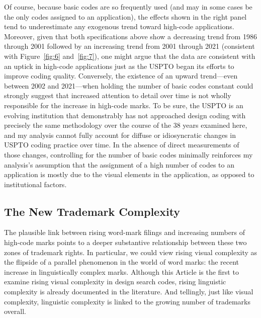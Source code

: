 \documentclass[letterpaper, 11pt, oneside]{article}
\begin{document}
Of course, because basic codes are so frequently used (and may in some cases be the only codes assigned to an application), the effects shown in the right panel tend to underestimate any exogenous trend toward high-code applications. Moreover, given that both specifications above show a decreasing trend from 1986 through 2001 followed by an increasing trend from 2001 through 2021 (consistent with Figure~\ref{fig:6} and~\ref{fig:7}), one might argue that the data are consistent with an uptick in high-code applications just as the USPTO began its efforts to improve coding quality. Conversely, the existence of an upward trend—even between 2002 and 2021—when holding the number of basic codes constant could strongly suggest that increased attention to detail over time is not wholly responsible for the increase in high-code marks. To be sure, the USPTO is an evolving institution that demonstrably has not approached design coding with precisely the same methodology over the course of the 38 years examined here, and my analysis cannot fully account for diffuse or idiosyncratic changes in USPTO coding practice over time. In the absence of direct measurements of those changes, controlling for the number of basic codes minimally reinforces my analysis's assumption that the assignment of a high number of codes to an application is mostly due to the visual elements in the application, as opposed to institutional factors.

\subsection{The New Trademark Complexity}\label{subsec:2C}

The plausible link between rising word-mark filings and increasing numbers of high-code marks points to a deeper substantive relationship between these two zones of trademark rights. In particular, we could view rising visual complexity as the flipside of a parallel phenomenon in the world of word marks: the recent increase in linguistically complex marks. Although this Article is the first to examine rising visual complexity in design search codes, rising linguistic complexity is already documented in the literature. And tellingly, just like visual complexity, linguistic complexity is linked to the growing number of trademarks overall.
\end{document}
